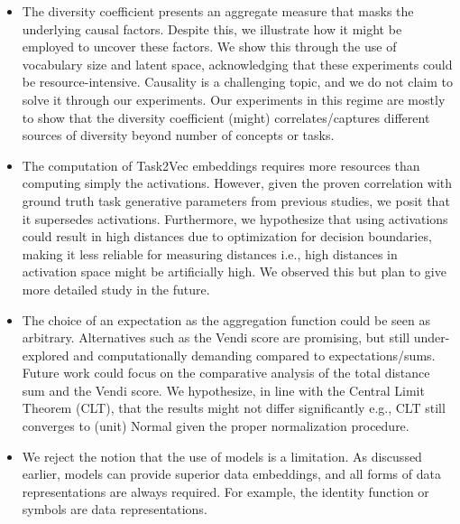 \begin{itemize}
    \item The diversity coefficient presents an aggregate measure that masks the underlying causal factors. 
    Despite this, we illustrate how it might be employed to uncover these factors.
    We show this through the use of vocabulary size and latent space, acknowledging that these experiments could be resource-intensive.
    Causality is a challenging topic, and we do not claim to solve it through our experiments. 
    Our experiments in this regime are mostly to show that the diversity coefficient (might) correlates/captures different sources of diversity beyond number of concepts or tasks.
    \item The computation of Task2Vec embeddings requires more resources than computing simply the activations. 
    However, given the proven correlation with ground truth task generative parameters from previous studies, we posit that it supersedes activations. 
    Furthermore, we hypothesize that using activations could result in high distances due to optimization for decision boundaries, making it less reliable for measuring distances 
    i.e., high distances in activation space might be artificially high.
    We observed this but plan to give more detailed study in the future. 
    \item The choice of an expectation as the aggregation function could be seen as arbitrary. 
    Alternatives such as the Vendi score are promising, but still under-explored and computationally demanding compared to expectations/sums. 
    Future work could focus on the comparative analysis of the total distance sum and the Vendi score. 
    We hypothesize, in line with the Central Limit Theorem (CLT), that the results might not differ significantly e.g., CLT still converges to (unit) Normal given the proper normalization procedure. 
    \item We reject the notion that the use of models is a limitation. 
    As discussed earlier, models can provide superior data embeddings, and all forms of data representations are always required.
    For example, the identity function or symbols are data representations.
\end{itemize}

